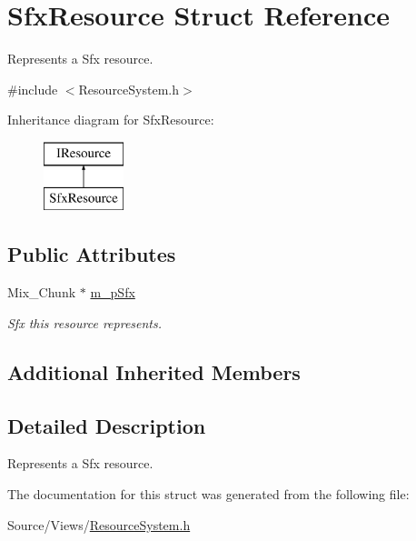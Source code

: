 \hypertarget{struct_sfx_resource}{}\section{Sfx\+Resource Struct Reference}
\label{struct_sfx_resource}


Represents a Sfx resource.  




{\ttfamily \#include $<$Resource\+System.\+h$>$}

Inheritance diagram for Sfx\+Resource\+:\begin{figure}[H]
\begin{center}
\leavevmode
\includegraphics[height=2.000000cm]{struct_sfx_resource}
\end{center}
\end{figure}
\subsection*{Public Attributes}
\begin{DoxyCompactItemize}
\item 
\mbox{\label{struct_sfx_resource_a5f29af4667386c5619c994a824a5efb2}} 
Mix\+\_\+\+Chunk $\ast$ \mbox{\hyperlink{struct_sfx_resource_a5f29af4667386c5619c994a824a5efb2}{m\+\_\+p\+Sfx}}
\begin{DoxyCompactList}\small\item\em Sfx this resource represents. \end{DoxyCompactList}\end{DoxyCompactItemize}
\subsection*{Additional Inherited Members}


\subsection{Detailed Description}
Represents a Sfx resource. 

The documentation for this struct was generated from the following file\+:\begin{DoxyCompactItemize}
\item 
Source/\+Views/\mbox{\hyperlink{_resource_system_8h}{Resource\+System.\+h}}\end{DoxyCompactItemize}
